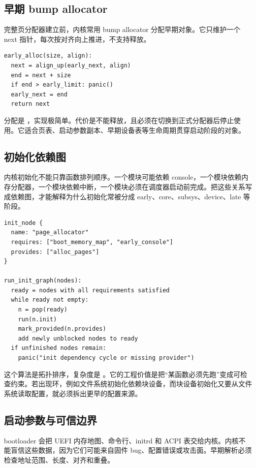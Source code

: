 \subsection{早期 bump allocator}

完整页分配器建立前，内核常用 bump allocator 分配早期对象。它只维护一个 next 指针，每次按对齐向上推进，不支持释放。

\begin{lstlisting}
early_alloc(size, align):
  next = align_up(early_next, align)
  end = next + size
  if end > early_limit: panic()
  early_next = end
  return next
\end{lstlisting}

分配是 ，实现极简单。代价是不能释放，且必须在切换到正式分配器后停止使用。它适合页表、启动参数副本、早期设备表等生命周期贯穿启动阶段的对象。

\subsection{初始化依赖图}

内核初始化不能只靠函数排列顺序。一个模块可能依赖 console，一个模块依赖内存分配器，一个模块依赖中断，一个模块必须在调度器启动前完成。把这些关系写成依赖图，才能解释为什么初始化常被分成 early、core、subsys、device、late 等阶段。

\begin{lstlisting}
init_node {
  name: "page_allocator"
  requires: ["boot_memory_map", "early_console"]
  provides: ["alloc_pages"]
}

run_init_graph(nodes):
  ready = nodes with all requirements satisfied
  while ready not empty:
    n = pop(ready)
    run(n.init)
    mark_provided(n.provides)
    add newly unblocked nodes to ready
  if unfinished nodes remain:
    panic("init dependency cycle or missing provider")
\end{lstlisting}

这个算法是拓扑排序，复杂度是 。它的工程价值是把“某函数必须先跑”变成可检查约束。若出现环，例如文件系统初始化依赖块设备，而块设备初始化又要从文件系统读取配置，就必须拆出更早的配置来源。

\subsection{启动参数与可信边界}

bootloader 会把 UEFI 内存地图、命令行、initrd 和 ACPI 表交给内核。内核不能盲信这些数据，因为它们可能来自固件 bug、配置错误或攻击面。早期解析必须检查地址范围、长度、对齐和重叠。

